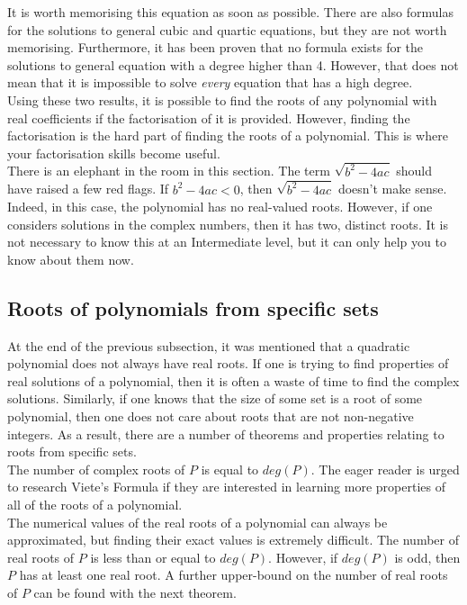 \documentclass[a4paper,12pt]{article}
\begin{document}
It is worth memorising this equation as soon as possible. There are also formulas for the solutions to general cubic and quartic equations, but they are not worth memorising. Furthermore, it has been proven that no formula exists for the solutions to general equation with a degree higher than 4. However, that does not mean that it is impossible to solve \emph{every} equation that has a high degree. \\

Using these two results, it is possible to find the roots of any polynomial with real coefficients if the factorisation of it is provided. However, finding the factorisation is the hard part of finding the roots of a polynomial. This is where your factorisation skills become useful. \\

There is an elephant in the room in this section. The term $\sqrt{b^2 - 4ac}$ should have raised a few red flags. If $b^2 - 4ac < 0$, then $\sqrt{b^2 - 4ac}$ doesn't make sense. Indeed, in this case, the polynomial has no real-valued roots. However, if one considers solutions in the complex numbers, then it has two, distinct roots. It is not necessary to know this at an Intermediate level, but it can only help you to know about them now.

\subsection{Roots of polynomials from specific sets}
At the end of the previous subsection, it was mentioned that a quadratic polynomial does not always have real roots. If one is trying to find properties of real solutions of a polynomial, then it is often a waste of time to find the complex solutions. Similarly, if one knows that the size of some set is a root of some polynomial, then one does not care about roots that are not non-negative integers. As a result, there are a number of theorems and properties relating to roots from specific sets. \\

The number of complex roots of $P$ is equal to $deg(P)$. The eager reader is urged to research Viete's Formula if they are interested in learning more properties of all of the roots of a polynomial. \\

The numerical values of the real roots of a polynomial can always be approximated, but finding their exact values is extremely difficult. The number of real roots of $P$ is less than or equal to $deg(P)$. However, if $deg(P)$ is odd, then $P$ has at least one real root. A further upper-bound on the number of real roots of $P$ can be found with the next theorem. 
\end{document}
